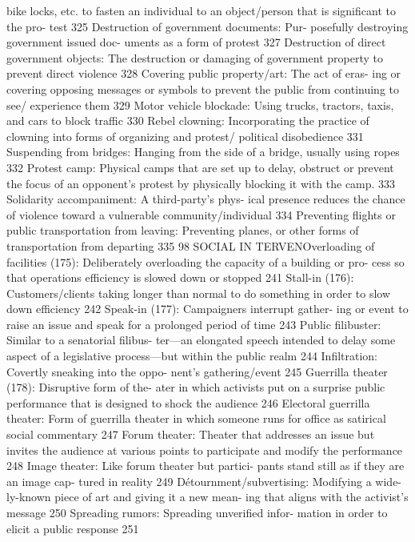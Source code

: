 \documentclass[twoside,a4paper,12pt,fleqn,openany]{extbook}
\begin{document}
bike locks, etc. to fasten an individual to an
object/person that is significant to the pro-
test
 325
Destruction of government documents: Pur-
posefully destroying government issued doc-
uments as a form of protest
 327
Destruction of direct government objects:
The destruction or damaging of government
property to prevent direct violence
 328
Covering public property/art: The act of eras-
ing or covering opposing messages or symbols
to prevent the public from continuing to see/
experience them
 329
Motor vehicle blockade: Using trucks, tractors,
taxis, and cars to block traffic
 330
Rebel clowning: Incorporating the practice of
clowning into forms of organizing and protest/
political disobedience
 331
Suspending from bridges: Hanging from the
side of a bridge, usually using ropes
 332
Protest camp: Physical camps that are set up
to delay, obstruct or prevent the focus of an
opponent’s protest by physically blocking it
with the camp.
 333
Solidarity accompaniment: A third-party’s phys-
ical presence reduces the chance of violence
toward a vulnerable community/individual 334
Preventing flights or public transportation
from leaving: Preventing planes, or other forms
of transportation from departing
 335
98
SOCIAL IN TERVENOverloading of facilities (175): Deliberately
overloading the capacity of a building or pro-
cess so that operations efficiency is slowed
down or stopped
 241
Stall-in (176): Customers/clients taking longer
than normal to do something in order to slow
down efficiency
 242
Speak-in (177): Campaigners interrupt gather-
ing or event to raise an issue and speak for a
prolonged period of time
 243
Public filibuster: Similar to a senatorial filibus-
ter—an elongated speech intended to delay
some aspect of a legislative process—but
within the public realm
 244
Infiltration: Covertly sneaking into the oppo-
nent’s gathering/event
 245
Guerrilla theater (178): Disruptive form of the-
ater in which activists put on a surprise public
performance that is designed to shock the
audience
 246
Electoral guerrilla theater: Form of guerrilla
theater in which someone runs for office as
satirical social commentary
 247
Forum theater: Theater that addresses an issue
but invites the audience at various points to
participate and modify the performance 248
Image theater: Like forum theater but partici-
pants stand still as if they are an image cap-
tured in reality
 249
Détournment/subvertising: Modifying a wide-
ly-known piece of art and giving it a new mean-
ing that aligns with the activist’s message 250
Spreading rumors: Spreading unverified infor-
mation in order to elicit a public response 251
\end{document}
